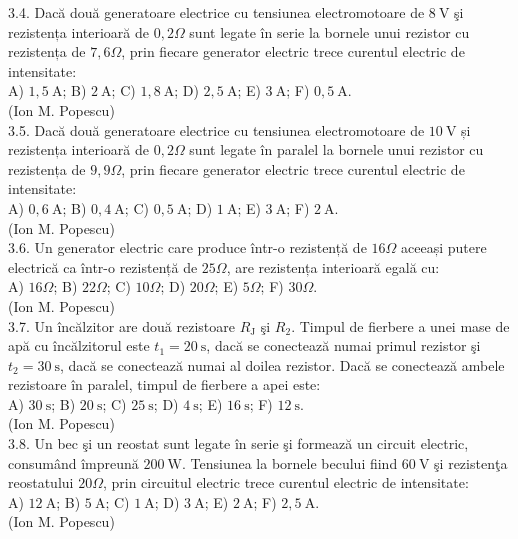 3.4. Dacă două generatoare electrice cu tensiunea electromotoare de $8 \mathrm{~V}$ şi rezistența interioară de $0,2 \Omega$ sunt legate în serie la bornele unui rezistor cu rezistența de $7,6 \Omega$, prin fiecare generator electric trece curentul electric de intensitate:\\ A) $1,5 \mathrm{~A}$; B) $2 \mathrm{~A}$; C) $1,8 \mathrm{~A}$; D) $2,5 \mathrm{~A}$; E) $3 \mathrm{~A}$; F) $0,5 \mathrm{~A}$.\\ (Ion M. Popescu)\\

3.5. Dacă două generatoare electrice cu tensiunea electromotoare de $10 \mathrm{~V}$ și rezistența interioară de $0,2 \Omega$ sunt legate în paralel la bornele unui rezistor cu rezistența de $9,9 \Omega$, prin fiecare generator electric trece curentul electric de intensitate:\\ A) $0,6 \mathrm{~A}$; B) $0,4 \mathrm{~A}$; C) $0,5 \mathrm{~A}$; D) $1 \mathrm{~A}$; E) $3 \mathrm{~A}$; F) $2 \mathrm{~A}$.\\ (Ion M. Popescu)\\

3.6. Un generator electric care produce într-o rezistență de $16 \Omega$ aceeași putere electrică ca într-o rezistență de $25 \Omega$, are rezistența interioară egală cu:\\ A) $16 \Omega$; B) $22 \Omega$; C) $10 \Omega$; D) $20 \Omega$; E) $5 \Omega$; F) $30 \Omega$.\\ (Ion M. Popescu)\\

3.7. Un încălzitor are două rezistoare $R_{\mathrm{J}}$ şi $R_{2}$. Timpul de fierbere a unei mase de apă cu încălzitorul este $t_{1}=20 \mathrm{~s}$, dacă se conectează numai primul rezistor şi $t_{2}=30 \mathrm{~s}$, dacă se conectează numai al doilea rezistor. Dacă se conectează ambele rezistoare în paralel, timpul de fierbere a apei este:\\ A) $30 \mathrm{~s}$; B) $20 \mathrm{~s}$; C) $25 \mathrm{~s}$; D) $4 \mathrm{~s}$; E) $16 \mathrm{~s}$; F) $12 \mathrm{~s}$.\\ (Ion M. Popescu)\\

3.8. Un bec şi un reostat sunt legate în serie şi formează un circuit electric, consumând împreună $200 \mathrm{~W}$. Tensiunea la bornele becului fiind $60 \mathrm{~V}$ şi rezistenţa reostatului $20 \Omega$, prin circuitul electric trece curentul electric de intensitate:\\ A) $12 \mathrm{~A}$; B) $5 \mathrm{~A}$; C) $1 \mathrm{~A}$; D) $3 \mathrm{~A}$; E) $2 \mathrm{~A}$; F) $2,5 \mathrm{~A}$.\\ (Ion M. Popescu)\\

